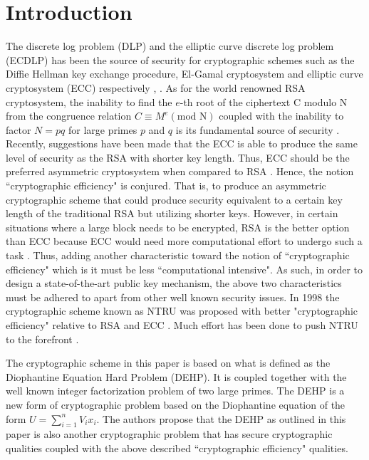 \documentclass{llncs}
\begin{document}
\section{Introduction}
The discrete log problem (DLP) and the elliptic curve discrete log
problem (ECDLP) has been the source of security for cryptographic
schemes such as the Diffie Hellman key exchange procedure,
El-Gamal cryptosystem and elliptic curve cryptosystem (ECC)
respectively \cite{6}, \cite{10}. As for the world renowned RSA
cryptosystem, the inability to find the $e$-th root of the
ciphertext C modulo N from the congruence relation $C\equiv M^e
(\textrm{mod N})$ coupled with the inability to factor $N=pq$ for
large primes $p$ and $q$ is its fundamental source of security
\cite{11}. Recently, suggestions have been made that the ECC is
able to produce the same level of security as the RSA with shorter
key length. Thus, ECC should be the preferred asymmetric
cryptosystem when compared to RSA \cite{16}. Hence, the notion
``cryptographic efficiency" is conjured. That is, to produce an
asymmetric cryptographic scheme that could produce security
equivalent to a certain key length of the traditional RSA but
utilizing shorter keys. However, in certain situations where a
large block needs to be encrypted, RSA is the better option than
ECC because ECC would need more computational effort to undergo
such a task \cite{14}. Thus, adding another characteristic toward
the notion of ``cryptographic efficiency" which is it must be less
``computational intensive". As such, in order to design a
state-of-the-art public key mechanism, the above two
characteristics must be adhered to apart from other well known
security issues. In 1998 the cryptographic scheme known as NTRU
was proposed with better "cryptographic efficiency" relative to
RSA and ECC \cite{9}.  Much effort has been done to push NTRU to
the forefront \cite{8}.

The cryptographic scheme in this paper is based on what is defined
as the Diophantine Equation Hard Problem (DEHP). It is coupled
together with the well known integer factorization problem of two
large primes. The DEHP is a new form of cryptographic problem
based on the Diophantine equation of the form
$U=\sum\limits_{i=1}^n {V_i x_{i}}$. The authors propose that the
DEHP as outlined in this paper is also another cryptographic
problem that has secure cryptographic qualities coupled with the
above described ``cryptographic efficiency" qualities.
\end{document}
